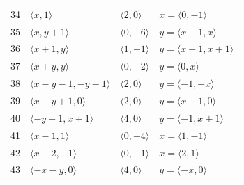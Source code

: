 \documentclass[11pt]{article}
\begin{document}
\begin{longtable}{@{}rlll@{}}
34 & $\langle x,1\rangle$ & $\langle 2,0\rangle$ & $x=\langle 0,-1\rangle$\\
35 & $\langle x,y+1\rangle$ & $\langle 0,-6\rangle$ & $y=\langle x-1,x\rangle$\\
36 & $\langle x+1,y\rangle$ & $\langle 1,-1\rangle$ & $y=\langle x+1,x+1\rangle$\\
37 & $\langle x+y,y\rangle$ & $\langle 0,-2\rangle$ & $y=\langle 0,x\rangle$\\
38 & $\langle x-y-1,-y-1\rangle$ & $\langle 2,0\rangle$ & $y=\langle -1,-x\rangle$\\
39 & $\langle x-y+1,0\rangle$ & $\langle 2,0\rangle$ & $y=\langle x+1,0\rangle$\\
40 & $\langle -y-1,x+1\rangle$ & $\langle 4,0\rangle$ & $y=\langle -1,x+1\rangle$\\
41 & $\langle x-1,1\rangle$ & $\langle 0,-4\rangle$ & $x=\langle 1,-1\rangle$\\
42 & $\langle x-2,-1\rangle$ & $\langle 0,-1\rangle$ & $x=\langle 2,1\rangle$\\
43 & $\langle -x-y,0\rangle$ & $\langle 4,0\rangle$ & $y=\langle -x,0\rangle$\\
\end{longtable}
\endgroup
\end{document}
